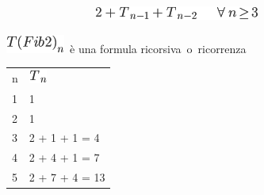 \documentclass{article}
\begin{document}
{~~~~~~~~~~~~~~~~}\includegraphics{images/image30.png}\includegraphics{images/image31.png}

{}

\includegraphics{images/image32.png}{~è una }{formula
ricorsiva}{~}{o}{~}{ricorrenza}

{}

\protect\hypertarget{t.b835927b516aa4a0b07c3acab4f4cd0150ff7dd8}{}{}\protect\hypertarget{t.1}{}{}

\begin{longtable}[]{@{}ll@{}}
\toprule
\begin{minipage}[t]{0.47\columnwidth}\raggedright\strut
{n}\strut
\end{minipage} & \begin{minipage}[t]{0.47\columnwidth}\raggedright\strut
\includegraphics{images/image23.png}{~}\strut
\end{minipage}\tabularnewline
\begin{minipage}[t]{0.47\columnwidth}\raggedright\strut
{1}\strut
\end{minipage} & \begin{minipage}[t]{0.47\columnwidth}\raggedright\strut
{1}\strut
\end{minipage}\tabularnewline
\begin{minipage}[t]{0.47\columnwidth}\raggedright\strut
{2}\strut
\end{minipage} & \begin{minipage}[t]{0.47\columnwidth}\raggedright\strut
{1}\strut
\end{minipage}\tabularnewline
\begin{minipage}[t]{0.47\columnwidth}\raggedright\strut
{3}\strut
\end{minipage} & \begin{minipage}[t]{0.47\columnwidth}\raggedright\strut
{2 + 1 + 1 = 4}\strut
\end{minipage}\tabularnewline
\begin{minipage}[t]{0.47\columnwidth}\raggedright\strut
{4}\strut
\end{minipage} & \begin{minipage}[t]{0.47\columnwidth}\raggedright\strut
{2 + 4 + 1 = 7}\strut
\end{minipage}\tabularnewline
\begin{minipage}[t]{0.47\columnwidth}\raggedright\strut
{5}\strut
\end{minipage} & \begin{minipage}[t]{0.47\columnwidth}\raggedright\strut
{2 + 7 + 4 = 13}\strut
\end{minipage}\tabularnewline
\bottomrule
\end{longtable}
\end{document}
